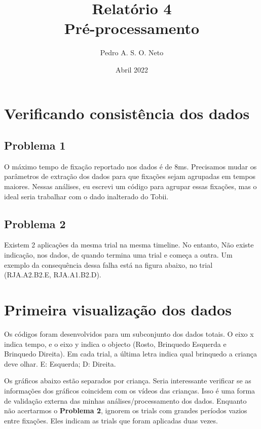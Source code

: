 \documentclass{article}
\title{Relatório 4 \\ Pré-processamento}
\author{Pedro A. S. O. Neto}
\date{Abril 2022}
\begin{document}
\maketitle

\section{Verificando consistência dos dados}

\subsection{Problema 1} 
O máximo tempo de fixação reportado nos dados é de 8ms. Precisamos mudar os parâmetros de extração dos dados para que fixações sejam agrupadas em tempos maiores. Nessas análises, eu escrevi um código para agrupar essas fixações, mas o ideal seria trabalhar com o dado inalterado do Tobii.

\subsection{Problema 2}
Existem 2 aplicações da mesma trial na mesma timeline. No entanto, Não existe indicação, nos dados, de quando termina uma trial e começa a outra. Um exemplo da consequência  dessa falha está na figura abaixo, no trial (RJA.A2.B2.E, RJA.A1.B2.D).

\section{Primeira visualização dos dados}

Os códigos foram desenvolvidos para um subconjunto dos dados totais. O eixo x indica tempo, e o eixo y indica o objecto (Rosto, Brinquedo Esquerda e Brinquedo Direita). Em cada trial, a última letra indica qual brinquedo a criança deve olhar. E: Esquerda; D: Direita.

Os gráficos abaixo estão separados por criança. Seria interessante verificar se as informações dos gráficos coincidem com os vídeos das crianças. Isso é uma forma de validação externa das minhas análises/processamento dos dados. Enquanto não acertarmos o \textbf{Problema 2}, ignorem os trials com grandes períodos vazios entre fixações. Eles indicam as trials que foram aplicadas duas vezes.
\end{document}
